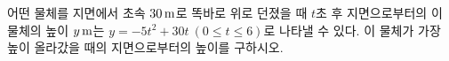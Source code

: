 어떤 물체를 지면에서 초속 $30\mkern3mu \mathrm{m}$로 똑바로 위로 던졌을 때 $t$초 후 지면으로부터의 이 물체의 높이 $y\mkern3mu \mathrm{m}$는 $y=-5t^2+30t \ (0\le t\le 6)$로 나타낼 수 있다. 이 물체가 가장 높이 올라갔을 때의 지면으로부터의 높이를 구하시오. 
